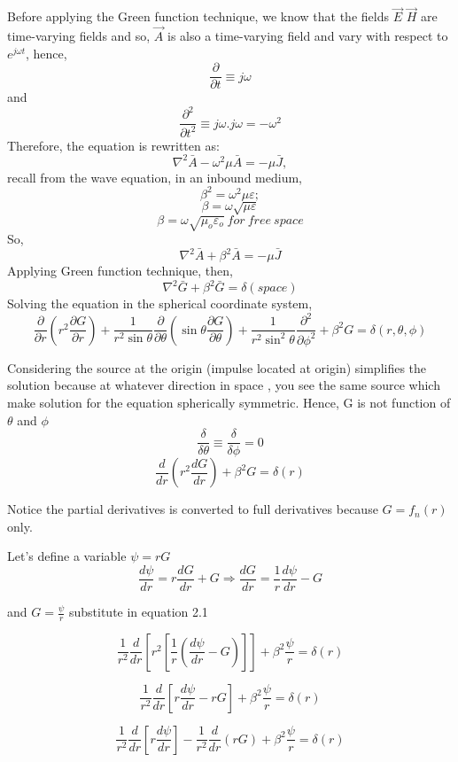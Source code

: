 Before applying the Green function technique, we know that the fields $\vec{E}$ $\vec{H}$ are time-varying fields and so, $\vec{A}$ is also a time-varying field and vary with respect to $e^{j\omega t}$, hence,
$$\frac{\partial}{\partial t} \equiv j\omega $$ and  $$\frac{\partial^{2}}{\partial t^{2}} \equiv j\omega.j\omega = -\omega^{2}$$
Therefore, the equation is rewritten as:
$$\nabla^{2}\bar{A}-\omega^{2}\mu\bar{A} = -\mu\bar{J},$$ recall from the wave equation, in an inbound medium,
$$\beta^{2} = \omega^{2}\mu \varepsilon;$$
$$\beta = \omega\sqrt{\mu \varepsilon}$$
$$  \beta    = \omega\sqrt{\mu_o \varepsilon_o} \ for \ free  \ space$$
So,
$$\nabla^{2}\bar{A}+\beta^{2}\bar{A} = -\mu\bar{J}$$
Applying Green function technique, then,
$$\nabla^{2}\bar{G}+\beta^{2}\bar{G} = \delta(space)$$
Solving the equation in the spherical coordinate system,
$$\frac{\partial}{\partial r} (r^{2} \frac{\partial G}{\partial r} ) + \frac{1}{r^2 \sin \theta} \frac{\partial}{\partial  \theta}(\sin \theta \frac{\partial G}{\partial \theta}) + \frac{1}{r^{2}\sin^{2}\theta} \frac{\partial^{2}}{\partial\phi^{2}} + \beta^{2}G = \delta(r,\theta,\phi)$$
\par Considering the source at the origin (impulse located at origin) simplifies the solution because at whatever direction in space , you see the same source which make solution for the equation spherically symmetric. Hence, G is not function of $\theta$ and $\phi$
$$\frac{\delta}{\delta \theta} \equiv \frac{\delta}{\delta \phi} = 0$$
\begin{equation}
\frac{d}{d r}(r^{2}\frac{d G}{d r}) +  \beta^{2}G = \delta(r)
\end{equation}

Notice the partial derivatives is converted to full derivatives because $G = f_{n}(r)$ only.

Let's define a variable $\psi = rG$
$$\frac{d\psi}{dr} = r\frac{dG}{dr} + G \Longrightarrow \frac{dG}{dr} = \frac{1}{r}{\frac{d\psi}{dr} - G}$$

and $G = \frac{\psi}{r}$ substitute in equation 2.1

$$\frac{1}{r^{2}}\frac{d}{dr}[r^{2}
[\frac{1}{r}(\frac{d\psi}{dr} - G)]] + \beta^{2}\frac{\psi}{r} = \delta(r)$$

$$\frac{1}{r^{2}}\frac{d}{dr}[r\frac{d\psi}{dr} - rG] + \beta^{2}\frac{\psi}{r} = \delta(r)$$

$$\frac{1}{r^{2}}\frac{d}{dr}[r\frac{d\psi}{dr}] - \frac{1}{r^{2}}\frac{d}{dr}(rG) + \beta^{2}\frac{\psi}{r} = \delta(r)$$

